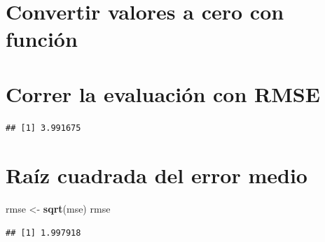\documentclass[
]{article}
\newenvironment{Shaded}{\begin{snugshade}}{\end{snugshade}}
\newcommand{\DecValTok}[1]{\textcolor[rgb]{0.00,0.00,0.81}{#1}}
\newcommand{\KeywordTok}[1]{\textcolor[rgb]{0.13,0.29,0.53}{\textbf{#1}}}
\newcommand{\NormalTok}[1]{#1}
\newcommand{\OperatorTok}[1]{\textcolor[rgb]{0.81,0.36,0.00}{\textbf{#1}}}
\newcommand{\StringTok}[1]{\textcolor[rgb]{0.31,0.60,0.02}{#1}}
\begin{document}
\hypertarget{convertir-valores-a-cero-con-funciuxf3n}{%
\section{Convertir valores a cero con
función}\label{convertir-valores-a-cero-con-funciuxf3n}}

\begin{Shaded}
\end{Shaded}

\hypertarget{correr-la-evaluaciuxf3n-con-rmse}{%
\section{Correr la evaluación con
RMSE}\label{correr-la-evaluaciuxf3n-con-rmse}}

\begin{Shaded}
\end{Shaded}

\begin{verbatim}
## [1] 3.991675
\end{verbatim}

\hypertarget{rauxedz-cuadrada-del-error-medio}{%
\section{Raíz cuadrada del error
medio}\label{rauxedz-cuadrada-del-error-medio}}

\begin{Shaded}
\begin{Highlighting}[]
\NormalTok{rmse <-}\StringTok{ }\KeywordTok{sqrt}\NormalTok{(mse)}
\NormalTok{rmse}
\end{Highlighting}
\end{Shaded}

\begin{verbatim}
## [1] 1.997918
\end{verbatim}
\end{document}
